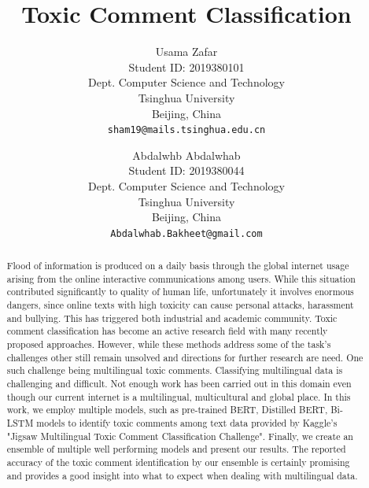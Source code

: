 \documentclass[10pt,twocolumn,letterpaper]{article}
\begin{document}
\title{ Toxic Comment Classification }

\author{Usama Zafar\\
Student ID: 2019380101\\
Dept. Computer Science and Technology\\
Tsinghua University \\
Beijing, China\\
{\tt\small sham19@mails.tsinghua.edu.cn}
\and
Abdalwhb Abdalwhab\\
Student ID: 2019380044\\
Dept. Computer Science and Technology\\
Tsinghua University \\
Beijing, China\\
{\tt\small Abdalwhab.Bakheet@gmail.com}
}

\maketitle

\begin{abstract}

Flood of information is produced on a daily basis through the global internet usage arising from the online interactive communications among users. While this situation contributed significantly to quality of human life, unfortunately it involves enormous dangers, since online texts with high toxicity can cause personal attacks, harassment and bullying. This has triggered both industrial and academic community. Toxic comment classification has become an active research field with many recently proposed approaches. However, while these methods address some of the task's challenges other still remain unsolved and directions for further research are need. One such challenge being multilingual toxic comments. Classifying multilingual data is challenging and difficult. Not enough work has been carried out in this domain even though our current internet is a multilingual, multicultural and global place. In this work, we employ multiple models, such as pre-trained BERT, Distilled BERT, Bi-LSTM models to identify toxic comments among text data provided by Kaggle's "Jigsaw Multilingual Toxic Comment Classification Challenge". Finally, we create an ensemble of multiple well performing models and present our results. The reported accuracy of the toxic comment identification by our ensemble is certainly promising and provides a good insight into what to expect when dealing with multilingual data.

\end{abstract}
\end{document}

